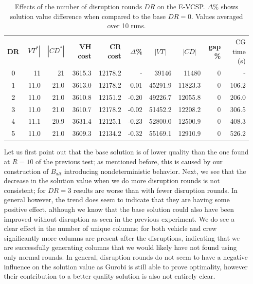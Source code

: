 \documentclass[]{article}
\begin{document}
\begin{table}[h]
  \centering
  \begin{tabular}{crrrrrrrrr}
    \toprule
       \textbf{DR} & $|VT^*|$ & $|CD^*|$ & \textbf{VH cost} & \textbf{CR cost} & \textbf{$\Delta$\%} & \multicolumn{1}{c}{$|VT|$} & \multicolumn{1}{c}{$|CD|$} & \textbf{gap \%} & CG time (s) \\
       \cmidrule(lr){1-1} \cmidrule(lr){2-6} \cmidrule(lr){7-8} \cmidrule(lr){9-10}
        0   & 11   & 21   & 3615.3 & 12178.2 & -    & 39146   & 11480 & 0 & -    \\
        1   & 11.0 & 21.0 & 3613.0 & 12178.2 & -0.01 & 45291.9 & 11823.3 & 0 & 106.2  \\
        2   & 11.0 & 21.0 & 3610.8 & 12151.2 & -0.20 & 49226.7 & 12055.8 & 0 & 206.0  \\
        3   & 11.0 & 21.0 & 3610.7 & 12178.2 & -0.02 & 51452.2 & 12208.2 & 0 & 306.5  \\
        4   & 11.1 & 20.9 & 3631.4 & 12125.1 & -0.23 & 52800.0 & 12500.9 & 0 & 408.3  \\
        5   & 11.0 & 21.0 & 3609.3 & 12134.2 & -0.32 & 55169.1 & 12910.9 & 0 & 526.2  \\
        \bottomrule
  \end{tabular}
  \caption{Effects of the number of disruption rounds $DR$ on the E-VCSP. $\Delta$\% shows solution value difference when compared to the base $DR=0$. Values averaged over 10 runs. }
  \label{tab:evcsp-disruptions}
\end{table}

Let us first point out that the base solution is of lower quality than the one found at $R=10$ of the previous test; as mentioned before, this is caused by our construction of $B_{alt}$ introducing nondeterministic behavior. Next, we see that the decrease in the solution value when we do more disruption rounds is not consistent; for $DR=3$ results are worse than with fewer disruption rounds. In general however, the trend does seem to indicate that they are having some positive effect, although we know that the base solution could also have been improved without disruption as seen in the previous experiment. We do see a clear effect in the number of unique columns; for both vehicle and crew significantly more columns are present after the disruptions, indicating that we are successfully generating columns that we would likely have not found using only normal rounds. In general, disruption rounds do not seem to have a negative influence on the solution value as Gurobi is still able to prove optimality, however their contribution to a better quality solution is also not entirely clear. \\
\end{document}
